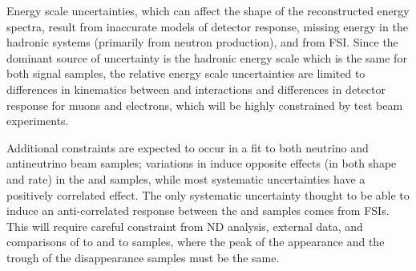 Energy scale uncertainties, which can affect the shape of the reconstructed energy spectra, result from
inaccurate models of detector response, missing energy in the hadronic systems (primarily from neutron production),
and from FSI. Since the dominant source of uncertainty is the hadronic energy scale which is the same for both
signal samples, the relative energy scale uncertainties are limited to differences in kinematics
between \numu and \nue interactions and differences in detector response for muons and electrons,
which will be highly constrained by test beam experiments.

Additional constraints are expected to occur in a fit to both neutrino and antineutrino beam samples;
variations in \deltacp induce opposite effects (in both shape and rate) in the \nue and \anue samples,
while most systematic uncertainties have a positively correlated effect.
The only systematic uncertainty thought to be able to induce an anti-correlated response between the \nue and \anue
samples comes from FSIs. This will require careful constraint from ND analysis, external data, and comparisons of
\nue to \numu and \anue to \anumu samples, where the peak of the appearance and the trough of the
disappearance samples must be the same. 


